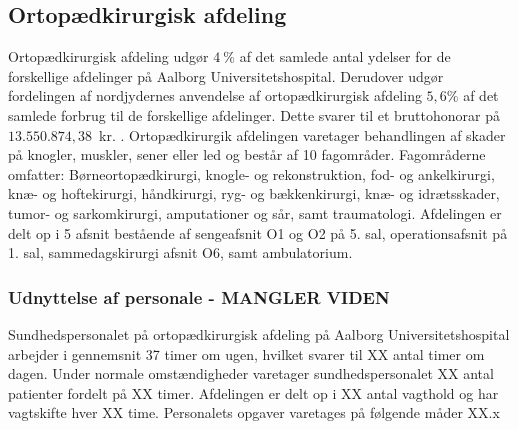 \subsection{Ortopædkirurgisk afdeling}
Ortopædkirurgisk afdeling udgør $4~\%$ af det samlede antal ydelser for de forskellige afdelinger på Aalborg Universitetshospital. Derudover udgør fordelingen af nordjydernes anvendelse af ortopædkirurgisk afdeling $5,6\%$ af det samlede forbrug til de forskellige afdelinger. Dette svarer til et bruttohonorar på $13.550.874,38$~kr. \cite{RegionNord2016}. Ortopædkirurgik afdelingen varetager behandlingen af skader på knogler, muskler, sener eller led og består af 10 fagområder. Fagområderne omfatter: Børneortopædkirurgi, knogle- og rekonstruktion, fod- og ankelkirurgi, knæ- og hoftekirurgi, håndkirurgi, ryg- og bækkenkirurgi, knæ- og idrætsskader, tumor- og sarkomkirurgi, amputationer og sår, samt traumatologi. Afdelingen er delt op i 5 afsnit bestående af sengeafsnit O1 og O2 på 5. sal, operationsafsnit på 1. sal, sammedagskirurgi afsnit O6, samt ambulatorium. \cite{Aalborg2016}


\subsubsection{Udnyttelse af personale - MANGLER VIDEN} 
Sundhedspersonalet på ortopædkirurgisk afdeling på Aalborg Universitetshospital arbejder i gennemsnit 37 timer om ugen, hvilket svarer til XX antal timer om dagen. \cite{Danske2015} Under normale omstændigheder varetager sundhedspersonalet XX antal patienter fordelt på XX timer. Afdelingen er delt op i XX antal vagthold og har vagtskifte hver XX time. Personalets opgaver varetages på følgende måder XX.x

